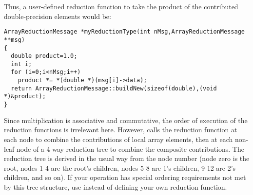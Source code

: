 Thus, a user-defined reduction function to take the product of the contributed double-precision elements would be:
\begin{verbatim}
ArrayReductionMessage *myReductionType(int nMsg,ArrayReductionMessage **msg)
{
  double product=1.0;
  int i;
  for (i=0;i<nMsg;i++)
    product *= *(double *)(msg[i]->data);
  return ArrayReductionMessage::buildNew(sizeof(double),(void *)&product);
}
\end{verbatim}

Since multiplication is associative and commutative, the order of execution of the
reduction functions is irrelevant here.  However, \charmpp calls the reduction function 
at each node to combine the contributions of local array elements, then at each
non-leaf node of a 4-way reduction tree to combine the composite contributions.  
The reduction tree is derived in the usual way from the node number (node zero
is the root, nodes 1-4 are the root's children, nodes 5-8 are 1's children, 
9-12 are 2's children, and so on). If your operation has special ordering 
requirements not met by this tree structure,
use  instead of defining your own reduction function.









